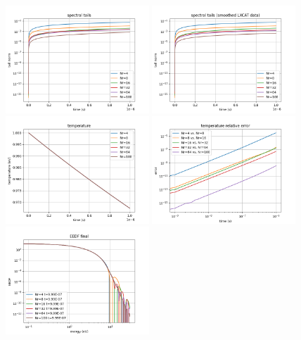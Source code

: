 \documentclass[mathserif, aspectratio=169]{beamer}
\begin{document}
\begin{frame}
\begin{figure}
{			}
			\only<+>
			{	
				\includegraphics[width=0.48\textwidth]{g0_mw_tails.png}
				\includegraphics[width=0.48\textwidth]{g0_mw_smoothed_tails.png}
			}
			\only<+>
			{
				\includegraphics[width=0.48\textwidth]{g0_mw_smoothed_temp.png}
				\includegraphics[width=0.48\textwidth]{g0_mw_smoothed_temp_error.png}
			}
			\only<+>
			{
				\includegraphics[width=0.48\textwidth]{g0_mw_smoothed_eedf_final.png}
}
\end{figure}
\end{frame}
\end{document}
